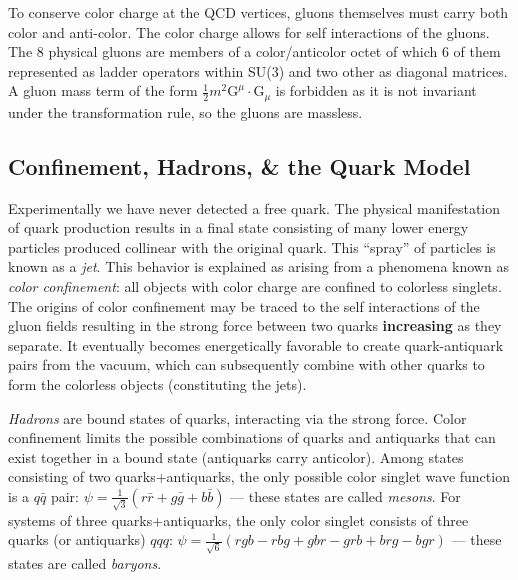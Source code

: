 To conserve color charge at the QCD vertices, gluons themselves must carry both color and anti-color. The color charge allows for self interactions of the gluons. The 8 physical gluons are members of a color/anticolor octet of which 6 of them represented as ladder operators within SU(3) and two other as diagonal matrices. A gluon mass term of the form $\frac{1}{2}m^{2}\bm{\mathrm{G}}^{\mu} \cdot \bm{\mathrm{G}}_{\mu}$ is forbidden as it is not invariant under the transformation rule, so the gluons are massless.

\subsection{Confinement, Hadrons, \& the Quark Model}

Experimentally we have never detected a free quark. The physical manifestation of quark production results in a final state consisting of many lower energy particles produced collinear with the original quark. This ``spray'' of particles is known as a \textit{jet}. This behavior is explained as arising from a phenomena known as \textit{color confinement}: all objects with color charge are confined to colorless singlets. The origins of color confinement may be traced to the self interactions of the gluon fields resulting in the strong force between two quarks \textbf{increasing} as they separate. It eventually becomes energetically favorable to create quark-antiquark pairs from the vacuum, which can subsequently combine with other quarks to form the colorless objects (constituting the jets).

\textit{Hadrons} are bound states of quarks, interacting via the strong force. Color confinement limits the possible combinations of quarks and antiquarks that can exist together in a bound state (antiquarks carry anticolor). Among states consisting of two quarks+antiquarks, the only possible color singlet wave function is a $q\bar{q}$ pair: $\psi = \frac{1}{\sqrt{3}} (r\bar{r} + g\bar{g} + b\bar{b})$ --- these states are called \textit{mesons}. For systems of three quarks+antiquarks, the only color singlet consists of three quarks (or antiquarks) $qqq$: $\psi = \frac{1}{\sqrt{6}} (rgb - rbg + gbr - grb +brg-bgr)$ --- these states are called \textit{baryons}.

